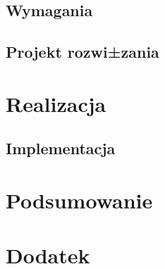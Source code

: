 \documentclass[american]{inz}
\begin{document}
\section{Wymagania}
\label{sec:wymagania}


\section{Projekt rozwi±zania}
\label{sec:rozwiazanie}



\chapter{Realizacja}
\label{chap:realizacja}


\section{Implementacja}
\label{sec:implementacja}



\chapter{Podsumowanie}
\label{chap:podsumowanie}





\appendix

\chapter{Dodatek}
\label{chap:dodatek}
\end{document}
